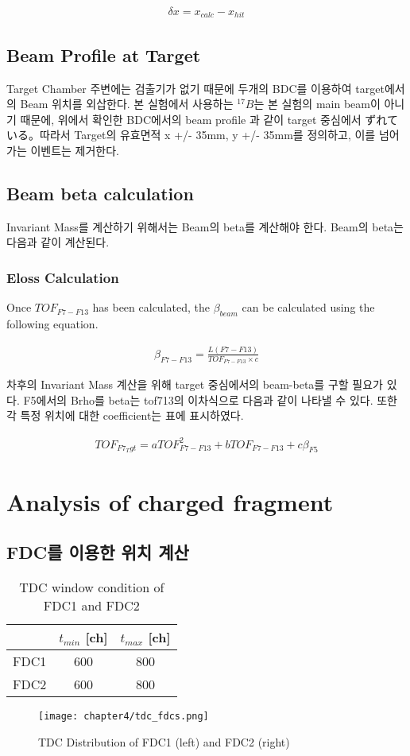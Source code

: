 \begin{align}
    \delta x = x_{calc} - x_{hit}
\end{align}
\subsection{Beam Profile at Target}
Target Chamber 주변에는 검출기가 없기 때문에 두개의 BDC를 이용하여 target에서의 Beam 위치를 외삽한다. 본 실험에서 사용하는 ${}^{17}B$는 본 실험의 main beam이 아니기 때문에, 위에서 확인한 BDC에서의 beam profile 과 같이 target 중심에서 ずれている。따라서 Target의 유효면적 x +/- 35mm, y +/- 35mm를 정의하고, 이를 넘어가는 이벤트는 제거한다.

\subsection{Beam beta calculation}
Invariant Mass를 계산하기 위해서는 Beam의 beta를 계산해야 한다. Beam의 beta는 다음과 같이 계산된다.

\subsubsection{Eloss Calculation}
Once $TOF_{F7-F13}$ has been calculated, the $\beta_{beam}$ can be calculated using the following equation. 

\begin{align}
    \beta_{F7-F13} = \frac{L(F7-F13)}{TOF_{F7-F13} \times c}
\end{align}

차후의 Invariant Mass 계산을 위해 target 중심에서의 beam-beta를 구할 필요가 있다. F5에서의 Brho를  beta는 tof713의 이차식으로 다음과 같이 나타낼 수 있다. 또한 각 특정 위치에 대한 coefficient는 표에 표시하였다.

\begin{align}
    TOF_{F7_Tgt} = a TOF_{F7-F13}^{2} + b TOF_{F7-F13} + c    \beta_{F5}  
\end{align}

\clearpage
\section{Analysis of charged fragment}
\subsection{FDC를 이용한 위치 계산}
\begin{table}
    \centering
    \begin{tabular}[h]{c|cc}
        \hline
        &$t_{min}$ [ch]&$t_{max}$ [ch]\\
        \hline
        FDC1&600&800\\
        FDC2&600&800\\        
        \hline
    \end{tabular}
    \caption[short]{TDC window condition of FDC1 and FDC2}
\end{table}
\begin{figure}
    \centering
    \texttt{[image: chapter4/tdc\_fdcs.png]}
    \caption{TDC Distribution of FDC1 (left) and FDC2 (right)}
    \label{TDC Distribution of FDCs}
\end{figure}
